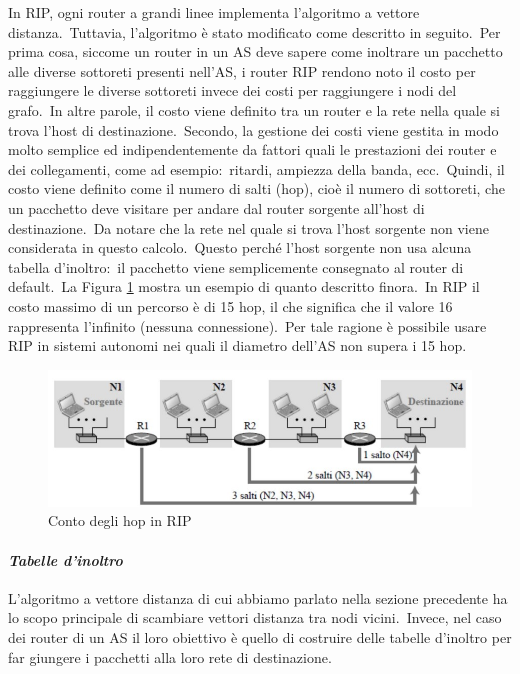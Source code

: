 In RIP, ogni router a grandi linee implementa l'algoritmo a vettore distanza.\
Tuttavia, l'algoritmo è stato modificato come descritto in seguito.\
Per prima cosa, siccome un router in un AS deve sapere come inoltrare un pacchetto alle diverse sottoreti presenti nell'AS, i router RIP rendono noto il costo per raggiungere le diverse sottoreti invece dei costi per raggiungere i nodi del grafo.\
In altre parole, il costo viene definito tra un router e la rete nella quale si trova l'host di destinazione.\
Secondo, la gestione dei costi viene gestita in modo molto semplice ed indipendentemente da fattori quali le prestazioni dei router e dei collegamenti, come ad esempio:\ ritardi, ampiezza della banda, ecc.\
Quindi, il costo viene definito come il numero di salti (hop), cioè il numero di sottoreti, che un pacchetto deve visitare per andare dal router sorgente all'host di destinazione.\
Da notare che la rete nel quale si trova l'host sorgente non viene considerata in questo calcolo.\
Questo perché l'host sorgente non usa alcuna tabella d'inoltro:\ il pacchetto viene semplicemente consegnato al router di default.\
La Figura \ref{RIP} mostra un esempio di quanto descritto finora.\
In RIP il costo massimo di un percorso è di 15 hop, il che significa che il valore 16 rappresenta l'infinito (nessuna connessione).\
Per tale ragione è possibile usare RIP in sistemi autonomi nei quali il diametro dell'AS non supera i 15 hop.

\begin{figure}[H]
    \centering
    \includegraphics[width=\textwidth]{immagini/RIP.jpg}
    \caption{Conto degli hop in RIP}
    \label{RIP}
\end{figure}

\paragraph{\emph{Tabelle d'inoltro}}

L'algoritmo a vettore distanza di cui abbiamo parlato nella sezione precedente ha lo scopo principale di scambiare vettori distanza tra nodi vicini.\
Invece, nel caso dei router di un AS il loro obiettivo è quello di costruire delle tabelle d'inoltro per far giungere i pacchetti alla loro rete di destinazione.

